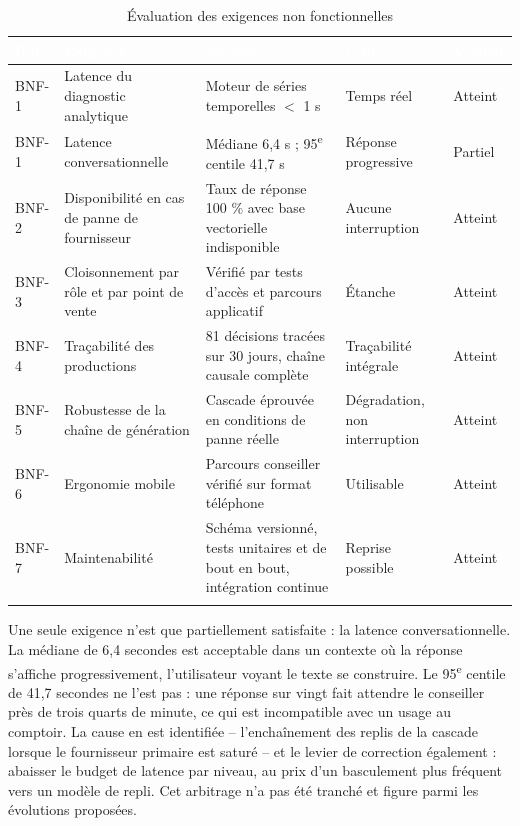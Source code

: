 \begingroup
\setlength{\tabcolsep}{3pt}
\renewcommand{\arraystretch}{1.15}
\small

\begin{longtable}{|P{1.2cm}|P{3.5cm}|P{4.2cm}|P{2.5cm}|P{2.0cm}|}
\hline
{}
\textcolor{white}{\textbf{Réf.}} &
\textcolor{white}{\textbf{Exigence}} &
\textcolor{white}{\textbf{Mesure}} &
\textcolor{white}{\textbf{Cible}} &
\textcolor{white}{\textbf{Verdict}} \\
\hline
\endhead
\hline
\endfoot
\hline
\endlastfoot
BNF-1 & Latence du diagnostic analytique & Moteur de séries temporelles $<$ 1 s & Temps réel & Atteint \\
\hline
BNF-1 & Latence conversationnelle & Médiane 6{,}4 s ; 95\textsuperscript{e} centile 41{,}7 s & Réponse progressive & Partiel \\
\hline
BNF-2 & Disponibilité en cas de panne de fournisseur & Taux de réponse 100 \% avec base vectorielle indisponible & Aucune interruption & Atteint \\
\hline
BNF-3 & Cloisonnement par rôle et par point de vente & Vérifié par tests d'accès et parcours applicatif & Étanche & Atteint \\
\hline
BNF-4 & Traçabilité des productions & 81 décisions tracées sur 30 jours, chaîne causale complète & Traçabilité intégrale & Atteint \\
\hline
BNF-5 & Robustesse de la chaîne de génération & Cascade éprouvée en conditions de panne réelle & Dégradation, non interruption & Atteint \\
\hline
BNF-6 & Ergonomie mobile & Parcours conseiller vérifié sur format téléphone & Utilisable & Atteint \\
\hline
BNF-7 & Maintenabilité & Schéma versionné, tests unitaires et de bout en bout, intégration continue & Reprise possible & Atteint \\
\hline
\caption{Évaluation des exigences non fonctionnelles}
\label{tab:nfr-chap5}
\end{longtable}
\endgroup

Une seule exigence n'est que partiellement satisfaite : la latence conversationnelle. La médiane de 6,4 secondes est acceptable dans un contexte où la réponse s'affiche progressivement, l'utilisateur voyant le texte se construire. Le 95\textsuperscript{e} centile de 41,7 secondes ne l'est pas : une réponse sur vingt fait attendre le conseiller près de trois quarts de minute, ce qui est incompatible avec un usage au comptoir. La cause en est identifiée -- l'enchaînement des replis de la cascade lorsque le fournisseur primaire est saturé -- et le levier de correction également : abaisser le budget de latence par niveau, au prix d'un basculement plus fréquent vers un modèle de repli. Cet arbitrage n'a pas été tranché et figure parmi les évolutions proposées.

